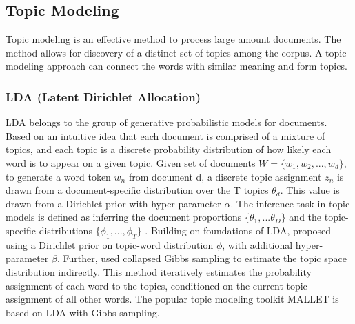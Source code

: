 \subsection{Topic Modeling}
Topic modeling is an effective method to process large amount documents. The method allows for discovery of a distinct set of topics among the corpus. A topic modeling approach can connect the words with similar meaning and form topics.

\subsubsection{LDA (Latent Dirichlet Allocation)}
LDA belongs to the group of generative probabilistic models for documents. Based on an intuitive idea that each document is comprised of a mixture of topics, and each topic is a discrete probability distribution of how likely each word is to appear on a given topic. Given set of documents $W = \{w_1, w_2, ...,  w_d\}$, to generate a word token $w_n$  from document d, a discrete topic assignment $z_n$ is drawn from a document-specific distribution over the T topics $\theta_d$. This value is drawn from a Dirichlet prior with hyper-parameter $\alpha$. The inference task in topic models is defined as inferring the document proportions $\{\theta_1, ... \theta_D\}$ and the topic-specific distributions $\{\phi_1, ... ,  \phi_T\}$ \cite{Mimno}. 
Building on foundations of LDA, \cite{Griffiths} proposed using a Dirichlet prior on topic-word distribution $\phi$, with additional hyper-parameter $\beta$. Further, \cite{Griffiths} used collapsed Gibbs sampling to estimate the topic space distribution indirectly. This method iteratively estimates the probability assignment of each word to the topics, conditioned on the current topic assignment of all other words. The popular topic modeling toolkit MALLET is based on LDA with Gibbs sampling.
